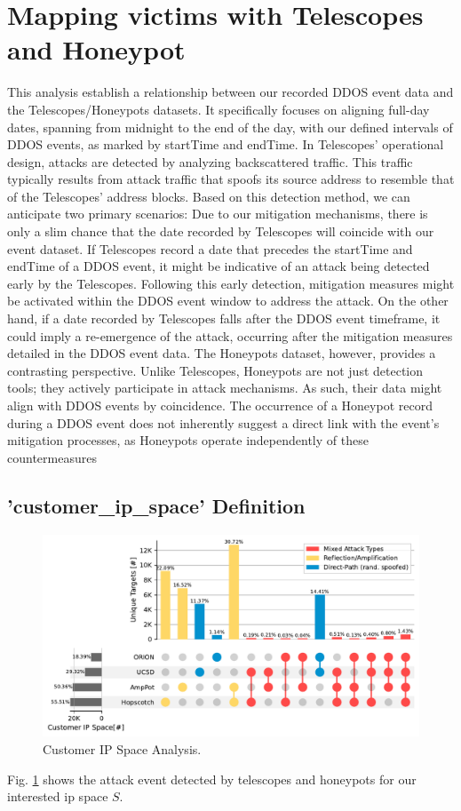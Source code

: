 \section{Mapping victims with Telescopes and Honeypot}\label{sec:mapping_victim}
This analysis establish a relationship between our recorded DDOS event data and the Telescopes/Honeypots datasets. It specifically focuses on aligning full-day dates, spanning from midnight to the end of the day, with our defined intervals of DDOS events, as marked by startTime and endTime. 
In Telescopes' operational design, attacks are detected by analyzing backscattered traffic. This traffic typically results from attack traffic that spoofs its source address to resemble that of the Telescopes' address blocks. Based on this detection method, we can anticipate two primary scenarios:
Due to our mitigation mechanisms, there is only a slim chance that the date recorded by Telescopes will coincide with our event dataset. If Telescopes record a date that precedes the startTime and endTime of a DDOS event, it might be indicative of an attack being detected early by the Telescopes. Following this early detection, mitigation measures might be activated within the DDOS event window to address the attack. On the other hand, if a date recorded by Telescopes falls after the DDOS event timeframe, it could imply a re-emergence of the attack, occurring after the mitigation measures detailed in the DDOS event data.
The Honeypots dataset, however, provides a contrasting perspective. Unlike Telescopes, Honeypots are not just detection tools; they actively participate in attack mechanisms. As such, their data might align with DDOS events by coincidence. The occurrence of a Honeypot record during a DDOS event does not inherently suggest a direct link with the event's mitigation processes, as Honeypots operate independently of these countermeasures

\subsection*{'customer\_ip\_space' Definition}
\begin{figure}[htbp]
    \centering
    \includegraphics[scale=0.4]{graphs/space_no_event.pdf}
    \caption{Customer IP Space Analysis.}
    \label{fig:customeripspace}
\end{figure}
Fig. \ref{fig:customeripspace} shows the attack event detected by telescopes and honeypots for our interested ip space $S$.
    
